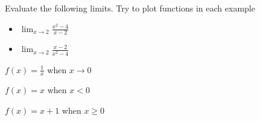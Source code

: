 \begin{example}
  Evaluate the following limits. Try to plot functions in each example
  \begin{itemize}
  \item \( \lim_{x \to 2} \frac{x^{2} -4}{x-2} \)
  \item \( \lim_{x \to 2} \frac{x-2}{x^{2} -4} \)
  \end{itemize}

  \begin{example}
   $f(x) = \frac{1}{x}$ when $x\to 0$

  \end{example}


  \begin{example}
   $f(x) = x$ when $x<0$

   $f(x) = x+1$ when $x \ge 0$

  \end{example}

  
\end{example}



